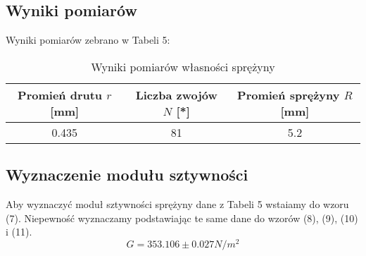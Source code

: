 \documentclass{article} %
\begin{document}
\subsection{Wyniki pomiarów}
Wyniki pomiarów zebrano w Tabeli 5:
\begin{center}
\begin{table}[h!]
\centering
\label{tab:coefficients}
\begin{tabular}{|c|c|c|}
\hline
\textbf{Promień drutu \( r \) [mm]} & \textbf{Liczba zwojów \( N \) [*]} &\textbf{Promień sprężyny $R$[mm]}\\ 
\hline
0.435 & 81 & 5.2 \\
\hline
\end{tabular}
\caption{Wyniki pomiarów własności sprężyny}
\end{table}
\end{center}
\subsection{Wyznaczenie modułu sztywności}
Aby wyznaczyć moduł sztywności sprężyny dane z Tabeli 5 wstaiamy do wzoru (7). Niepewność wyznaczamy podstawiając te same dane do wzorów (8), (9), (10) i (11).
{\large
\begin{equation}
    G=353.106\pm0.027N/m^2
\end{equation}
}

\begin{comment}
\subsection{Opis doświadczenia}
\subsection{Wyprowadzenie wzorów}
\subsection{Niepewność pomiarowa}
\subsection{Wyniki pomiarów}
\subsection{Wyniki doświadczenia}
\subsection{Wyznaczenie współczynnika sprężystości $k$}
\end{comment}
\end{document}
